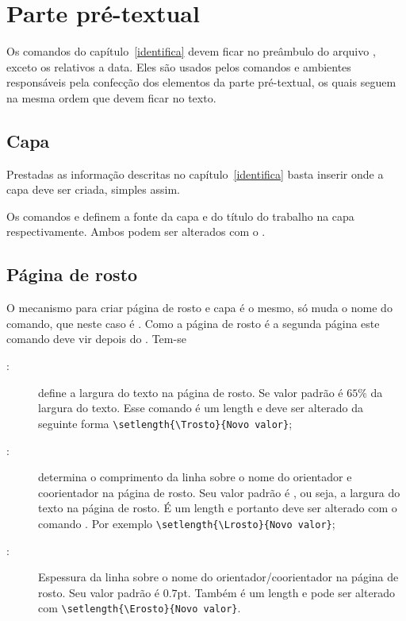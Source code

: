
\chapter{Parte pré-textual}

Os comandos do capítulo~\ref{identifica} devem ficar no preâmbulo do arquivo
, exceto os relativos a data. Eles são usados pelos
comandos e ambientes responsáveis pela confecção dos elementos
da parte pré-textual, os quais seguem na mesma ordem que devem ficar no texto.

\section{Capa}

Prestadas as informação descritas no capítulo~\ref{identifica} basta
inserir  onde a capa deve ser criada, simples assim.

Os comandos   e  definem a fonte da capa e
do título do trabalho na capa respectivamente. Ambos podem ser alterados com o
.

\section{Página de rosto}

O mecanismo para criar página de rosto e capa é o mesmo, só
muda o nome do comando, que neste caso é . Como a
página de rosto é a segunda página este comando deve vir depois
do . Tem-se
\begin{description}
  \item[:] define a largura do texto na página de
      rosto. Se valor padrão é $65\%$ da largura do texto. Esse
      comando é um length e deve ser alterado da seguinte forma
      \verb|\setlength{\Trosto}{Novo valor}|;
  \item[:] determina o comprimento da linha sobre
      o nome do orientador e coorientador na página de rosto. Seu
      valor padrão é , ou seja, a largura do texto
      na página de rosto. É um length e portanto deve ser alterado
      com o comando . Por exemplo
      \verb|\setlength{\Lrosto}{Novo valor}|;
  \item[:] Espessura da linha sobre o nome do
      orientador/coorientador na página de rosto. Seu valor padrão
      é $0.7$pt. Também é um length e pode ser alterado com
      \verb|\setlength{\Erosto}{Novo valor}|.
\end{description}


